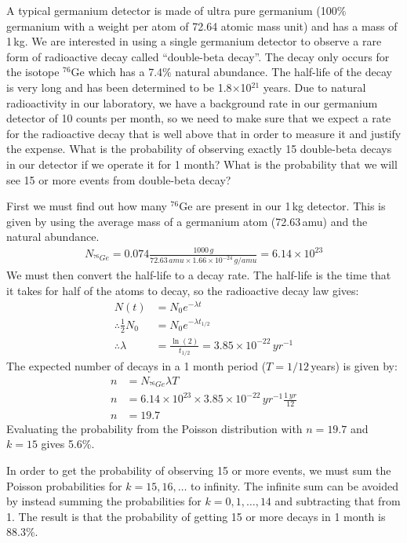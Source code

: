 \begin{example}{A typical germanium detector is made of ultra pure germanium (100\% germanium with a weight per atom of 72.64 atomic mass unit) and has a mass of 1\,kg. We are interested in using a single germanium detector to observe a rare form of radioactive decay called ``double-beta decay''. The decay only occurs for the isotope $^{76}$Ge which has a 7.4\% natural abundance. The half-life of the decay is very long and has been determined to be 1.8$\times$10$^{21}$ years. Due to natural radioactivity in our laboratory, we have a background rate in our germanium detector of 10 counts per month, so we need to make sure that we expect a rate for the radioactive decay that is well above that in order to measure it and justify the expense. What is the probability of observing exactly 15 double-beta decays in our detector if we operate it for 1 month? What is the probability that we will see 15 or more events from double-beta decay?}

First we must find out how many $^{76}$Ge are present in our 1\,kg detector. This is given by using the average mass of a germanium atom (72.63\,amu) and the natural abundance. 
\begin{align*}
N_{^{76}Ge}=0.074\frac{1000\,g}{72.63\,amu\times1.66\times10^{-24}\,g/amu}=6.14\times10^{23}
\end{align*}
We must then convert the half-life to a decay rate. The half-life is the time that it takes for half of the atoms to decay, so the radioactive decay law gives:
\begin{align*}
N(t)&=N_0e^{-\lambda t}\\
\therefore \frac{1}{2}N_0&=N_0e^{-\lambda t_{1/2}}\\
\therefore \lambda&=\frac{\ln(2)}{t_{1/2}}=3.85\times 10^{-22}\,yr^{-1}
\end{align*}
The expected number of decays in a 1 month period ($T=1/12$\,years) is given by:
\begin{align*}
n&=N_{^{76}Ge}\lambda T\\
n&=6.14\times10^{23}\times3.85\times 10^{-22}\,yr^{-1}\frac{1\,yr}{12}\\
n&=19.7
\end{align*}
Evaluating the probability from the Poisson distribution with $n=19.7$ and $k=15$ gives 5.6\%.

In order to get the probability of observing 15 or more events, we must sum the Poisson probabilities for $k=15,16,\dots$ to infinity. The infinite sum can be avoided by instead summing the probabilities for $k=0,1,\dots,14$ and subtracting that from 1. The result is that the probability of getting 15 or more decays in 1 month is 88.3\%.


\end{example}
